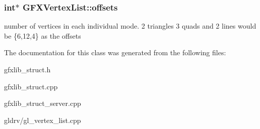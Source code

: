\subsubsection[{\texorpdfstring{offsets}{offsets}}]{\setlength{\rightskip}{0pt plus 5cm}int$\ast$ G\+F\+X\+Vertex\+List\+::offsets\hspace{0.3cm}{\ttfamily [protected]}}\hypertarget{classGFXVertexList_a0310e1bd4dbc7bfb1240b200368ce8c9}{}\label{classGFXVertexList_a0310e1bd4dbc7bfb1240b200368ce8c9}
number of vertices in each individual mode. 2 triangles 3 quads and 2 lines would be \{6,12,4\} as the offsets 

The documentation for this class was generated from the following files\+:\begin{DoxyCompactItemize}
\item 
gfxlib\+\_\+struct.\+h\item 
gfxlib\+\_\+struct.\+cpp\item 
gfxlib\+\_\+struct\+\_\+server.\+cpp\item 
gldrv/gl\+\_\+vertex\+\_\+list.\+cpp\end{DoxyCompactItemize}
